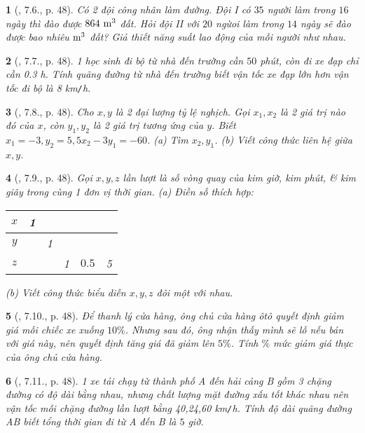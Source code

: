 \documentclass{article}
\newtheorem{baitoan}{}
\begin{document}
\begin{baitoan}[\cite{Binh_boi_duong_Toan_7_tap_1}, 7.6., p. 48]
	Có 2 đội công nhân làm đường. Đội I có $35$ người làm trong $16$ ngày thì đào được $\rm864\ m^3$ đất. Hỏi đội II với $20$ ngừoi làm trong $14$ ngày sẽ đào được bao nhiêu $\rm m^3$ đất? Giả thiết năng suất lao động của mỗi người như nhau.
\end{baitoan}

\begin{baitoan}[\cite{Binh_boi_duong_Toan_7_tap_1}, 7.7., p. 48]
	1 học sinh đi bộ từ nhà đến trường cần $50$ phút, còn đi xe đạp chỉ cần {\rm0.3 h}. Tính quãng đường từ nhà đến trường biết vận tốc xe đạp lớn hơn vận tốc đi bộ là {\rm8 km{\tt/}h}.
\end{baitoan}

\begin{baitoan}[\cite{Binh_boi_duong_Toan_7_tap_1}, 7.8., p. 48]
	Cho $x,y$ là 2 đại lượng tỷ lệ nghịch. Gọi $x_1,x_2$ là 2 giá trị nào đó của $x$, còn $y_1,y_2$ là 2 giá trị tương ứng của $y$. Biết $x_1 = -3,y_2 = 5,5x_2 - 3y_1 = -60$. (a) Tìm $x_2,y_1$. (b) Viết công thức liên hệ giữa $x,y$.
\end{baitoan}

\begin{baitoan}[\cite{Binh_boi_duong_Toan_7_tap_1}, 7.9., p. 48]
	Gọi $x,y,z$ lần lượt là số vòng quay của kim giờ, kim phút, \& kim giây trong cùng 1 đơn vị thời gian. (a) Điền số thích hợp:
	\begin{table}[H]
		\centering
		\begin{tabular}{|c|c|c|c|c|c|}
			\hline
			$x$ & 1 &  &  &  &  \\
			\hline
			$y$ &  & 1 &  &  &  \\
			\hline
			$z$ &  &  & 1 & $0.5$ & 5 \\
			\hline
		\end{tabular}
	\end{table}
	\noindent(b) Viết công thức biểu diễn $x,y,z$ đôi một với nhau.
\end{baitoan}

\begin{baitoan}[\cite{Binh_boi_duong_Toan_7_tap_1}, 7.10., p. 48]
	Để thanh lý cửa hàng, ông chủ cửa hàng ôtô quyết định giảm giá mỗi chiếc xe xuống $10\%$. Nhưng sau đó, ông nhận thấy mình sẽ lỗ nếu bán với giá này, nên quyết định tăng giá đã giảm lên $5\%$. Tính $\%$ mức giảm giá thực của ông chủ cửa hàng.
\end{baitoan}

\begin{baitoan}[\cite{Binh_boi_duong_Toan_7_tap_1}, 7.11., p. 48]
	1 xe tải chạy từ thành phố A đến hải cảng B gồm 3 chặng đường có độ dài bằng nhau, nhưng chất lượng mặt đường xấu tốt khác nhau nên vận tốc mỗi chặng đường lần lượt bằng {\rm40,24,60 km{\tt/}h}. Tính độ dài quãng đường AB biết tổng thời gian đi từ A đến B là $5$ giờ.
\end{baitoan}
\end{document}
